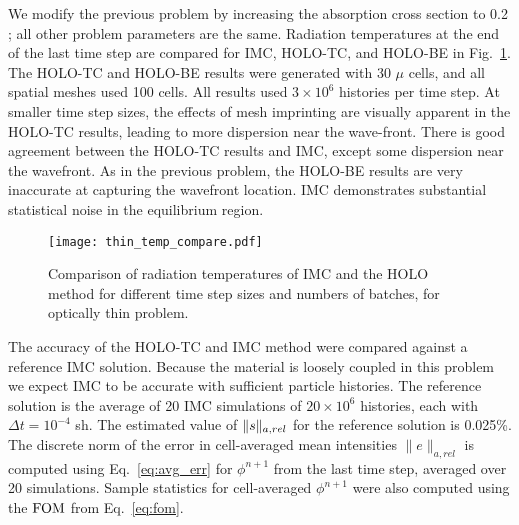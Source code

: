 We modify the previous problem by increasing the absorption cross section to 0.2
\invcm; all other problem parameters are the same.  Radiation temperatures at the end of
the last time step are compared for IMC, HOLO-TC, and HOLO-BE in
Fig.~\ref{fig:thin_temp_compare}.  The HOLO-TC and HOLO-BE results were generated with 30
$\mu$ cells, and all spatial meshes used 100 cells.  All results used $3\times10^6$
histories per time step.  At smaller time step sizes, the
effects of mesh imprinting are visually apparent in the HOLO-TC results, leading to more
dispersion near the wave-front.  There is good agreement between
the HOLO-TC results and IMC, except some dispersion near the wavefront.
As in the previous problem, the HOLO-BE results are very
inaccurate at capturing the wavefront location. 
IMC demonstrates substantial statistical noise in the equilibrium region.

\begin{figure}[H]
  \centering
    \texttt{[image: thin\_temp\_compare.pdf]}
    \caption{\label{fig:thin_temp_compare} Comparison of radiation temperatures of IMC and
    the HOLO method for different time step sizes and numbers of batches, for optically
thin problem. }
\end{figure}

The accuracy of the HOLO-TC and IMC method were compared against a reference IMC solution.
Because the material is loosely coupled in this problem we expect IMC to be accurate with sufficient particle
histories.  The
reference solution is the average of 20 IMC simulations of $20\times10^6$
histories, each with $\Delta t =10^{-4}$ sh.  The estimated value of $\ss$ for the
reference solution is 0.025\%.  The discrete norm of the error in cell-averaged mean
intensities $\|e\|_{a,rel}$ is computed using Eq.~\eqref{eq:avg_err} for $\phi^{n+1}$ from the last time
step, averaged over 20 simulations.  Sample statistics for cell-averaged $\phi^{n+1}$ were also computed using the $\FOM$
from Eq.~\eqref{eq:fom}.

